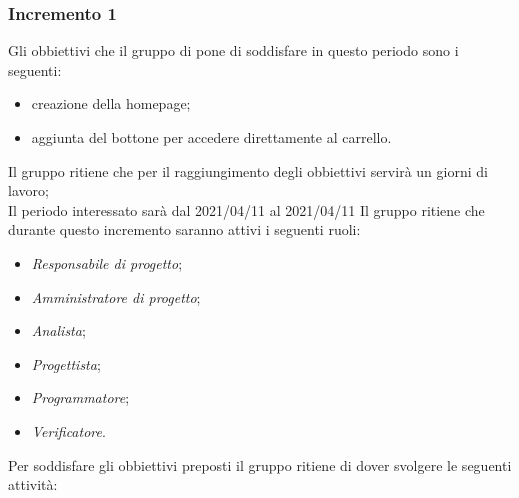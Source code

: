 \subsubsection{Incremento 1}
Gli obbiettivi che il gruppo di pone di soddisfare in questo periodo sono i seguenti:
\begin{itemize}
    \item creazione della homepage;
    \item aggiunta del bottone per accedere direttamente al carrello.
\end{itemize}
Il gruppo ritiene che per il raggiungimento degli obbiettivi servirà un giorni di lavoro;\\
Il periodo interessato sarà dal 2021/04/11 al 2021/04/11
Il gruppo ritiene che durante questo incremento saranno attivi i seguenti ruoli:
\begin{itemize}
    \item \textit{Responsabile di progetto};
    \item \textit{Amministratore di progetto};
    \item \textit{Analista};
    \item \textit{Progettista};
    \item \textit{Programmatore};
    \item \textit{Verificatore}.
\end{itemize}
Per soddisfare gli obbiettivi preposti il gruppo ritiene di dover svolgere le seguenti attività:
